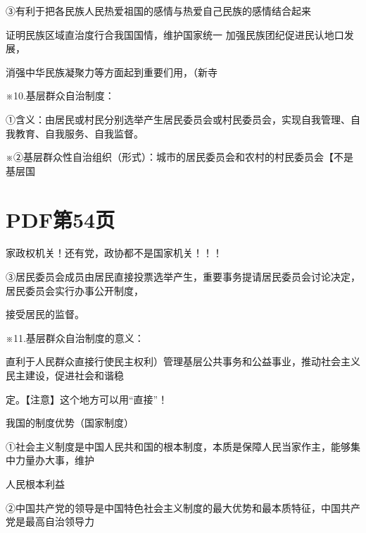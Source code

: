 \documentclass[lang=cn,11pt]{elegantbook}
\newcommand{\daofasym}[1]{{\daofasymbolfont #1}}
\newcommand{\daofasym}[1]{#1}
\begin{document}
\daofasym{③}有利于把各民族人民热爱祖国的感情与热爱自己民族的感情结合起来\par

证明民族区域直治度行合我国国情，维护国家统一 加强民族团纪促进民认地口发展，\par

消强中华民族凝聚力等方面起到重要们用，（新寺\par

※10.基层群众自治制度：\par

\daofasym{①}含义：由居民或村民分别选举产生居民委员会或村民委员会，实现自我管理、自我教育、自我服务、自我监督。\par

※\daofasym{②}基层群众性自治组织（形式）：城市的居民委员会和农村的村民委员会【不是基层国\par


\section*{PDF第54页}

家政权机关！还有党，政协都不是国家机关！！！\par

\daofasym{③}居民委员会成员由居民直接投票选举产生，重要事务提请居民委员会讨论决定，居民委员会实行办事公开制度，\par

接受居民的监督。\par

※11.基层群众自治制度的意义：\par

直利于人民群众直接行使民主权利）管理基层公共事务和公益事业，推动社会主义民主建设，促进社会和谐稳\par

定。【注意】这个地方可以用“直接”！\par

我国的制度优势（国家制度）\par

\daofasym{①}社会主义制度是中国人民共和国的根本制度，本质是保障人民当家作主，能够集中力量办大事，维护\par

人民根本利益\par

\daofasym{②}中国共产党的领导是中国特色社会主义制度的最大优势和最本质特征，中国共产党是最高自治领导力\par
\end{document}

